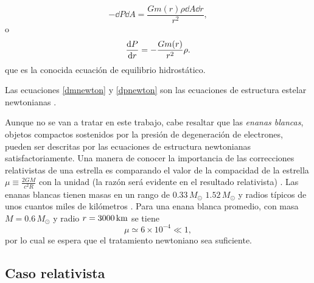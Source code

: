 \begin{equation}
    -\dd{P}\dd{A} =\frac{G m(r)\rho \dd{A} \dd{r}}{r^2},
\end{equation}
o
\begin{equation}
    \dv{P}{r} = - \frac { G m ( r ) } { r ^ { 2 } } \rho.
    \label{dpnewton}
\end{equation}
que es la conocida ecuación de equilibrio hidrostático. 

Las ecuaciones \eqref{dmnewton} y \eqref{dpnewton} son las ecuaciones de estructura estelar newtonianas \cite{Chandrasekhar1958}. 



Aunque no se van a tratar en este trabajo, cabe resaltar que las \emph{enanas blancas}, objetos compactos sostenidos por la presión de degeneración de electrones, pueden ser descritas por las ecuaciones de estructura newtonianas satisfactoriamente. Una manera de conocer la importancia de las correcciones relativistas de una estrella es comparando el valor de la compacidad de la estrella $\mu \equiv \frac{2GM}{c^2R}$ con la unidad (la razón será evidente en el resultado relativista) \cite{Weinberg1972}. Las enanas blancas tienen masas en un rango de $0.33\,M_{\odot}$ $1.52\,M_{\odot}$ y radios típicos de unos cuantos miles de kilómetros \cite{Glendenning2000}. Para una enana blanca promedio, con masa $M=0.6\,M_{\odot}$ y radio $r=3000 \,\rm{km}$ se tiene
\begin{equation}
    \mu \simeq 6\times 10^{-4}\ll 1,
\end{equation}
por lo cual se espera que el tratamiento newtoniano sea suficiente. 

\subsection{Caso relativista}\label{CR}

